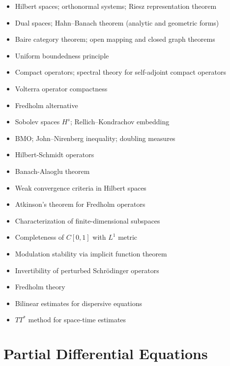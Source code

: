 \documentclass{amsart}
\begin{document}
\begin{itemize}
  \item Hilbert spaces; orthonormal systems; Riesz representation theorem
  \item Dual spaces; Hahn--Banach theorem (analytic and geometric forms)
  \item Baire category theorem; open mapping and closed graph theorems
  \item Uniform boundedness principle
  \item Compact operators; spectral theory for self-adjoint compact operators
  \item Volterra operator compactness
  \item Fredholm alternative
  \item Sobolev spaces $H^s$; Rellich--Kondrachov embedding
  \item BMO; John--Nirenberg inequality; doubling measures
  \item Hilbert-Schmidt operators
  \item Banach-Alaoglu theorem
  \item Weak convergence criteria in Hilbert spaces
  \item Atkinson's theorem for Fredholm operators
  \item Characterization of finite-dimensional subspaces
  \item Completeness of $C[0,1]$ with $L^1$ metric
  \item Modulation stability via implicit function theorem
  \item Invertibility of perturbed Schr\"odinger operators
  \item Fredholm theory
  \item Bilinear estimates for dispersive equations
  \item $TT^*$ method for space-time estimates
\end{itemize}

\section{Partial Differential Equations}
\end{document}
